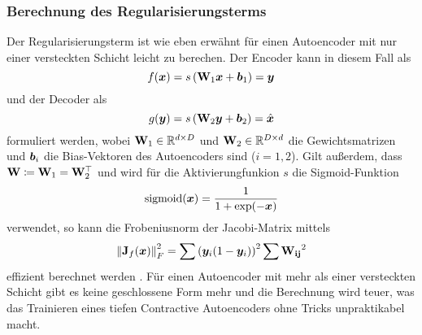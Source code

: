 \subsubsection{Berechnung des Regularisierungsterms}
\label{ch:MethodenDerDimRed:ML:CAE:BerechnungRegTerm}
Der Regularisierungsterm ist wie eben erwähnt für einen Autoencoder mit nur einer versteckten Schicht leicht zu berechen. Der Encoder
kann in diesem Fall als
\begin{equation}
	f(\bm{x}) = s \left( \mathbf{W}_1 \bm{x} + \bm{b}_1 \right) = \bm{y}
\end{equation}
und der Decoder als
\begin{equation}
	g(\bm{y}) = s \left( \mathbf{W}_2 \bm{y} + \bm{b}_2 \right) = \hat{\bm{x}}
\end{equation}
formuliert werden, wobei $\mathbf{W}_1 \in \mathbb{R}^{d \times D}$ und $\mathbf{W}_2 \in \mathbb{R}^{D \times d}$ die Gewichtsmatrizen und $\bm{b}_i$ die Bias-Vektoren des Autoencoders sind ($i = 1, 2$). Gilt außerdem, dass $\mathbf{W} \coloneqq \mathbf{W}_1 = \mathbf{W}^\top_2$ und wird für die Aktivierungfunkion $s$ die Sigmoid-Funktion
\begin{equation}
	\operatorname{sigmoid}(\bm{x}) = \frac{1}{1 + \exp (-\bm{x})}
\end{equation}
verwendet, so kann die Frobeniusnorm der Jacobi-Matrix mittels
\begin{equation}
	\left\lVert\mathbf{J}_f(\bm{x})\right\rVert_F^2 = \sum \left( \bm{y}_i (1 - \bm{y}_i)\right)^2 \sum \mathbf{W_{ij}}^2
\end{equation}
effizient berechnet werden \parencite[4]{Rifai.2011}. Für einen Autoencoder mit mehr als einer versteckten Schicht gibt es keine
geschlossene Form mehr und die Berechnung wird teuer, was das Trainieren eines tiefen Contractive
Autoencoders ohne Tricks unpraktikabel macht.